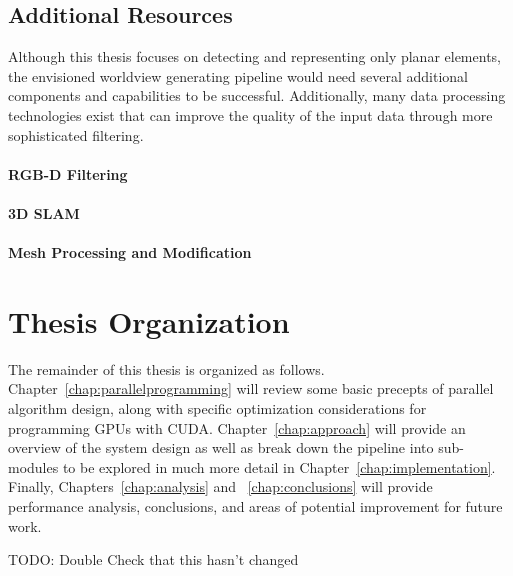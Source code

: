 \subsection{Additional Resources}
Although this thesis focuses on detecting and representing only planar elements, the envisioned worldview generating pipeline would need several additional components and capabilities to be successful. Additionally, many data processing technologies exist that can improve the quality of the input data through more sophisticated filtering.
\paragraph{RGB-D Filtering}
\paragraph{3D SLAM}
\paragraph{Mesh Processing and Modification}
\section{Thesis Organization} %
The remainder of this thesis is organized as follows. Chapter~\ref{chap:parallelprogramming} will review some basic precepts of parallel algorithm design, along with specific optimization considerations for programming GPUs with CUDA. Chapter~\ref{chap:approach} will provide an overview of the system design as well as break down the pipeline into sub-modules to be explored in much more detail in Chapter~\ref{chap:implementation}. Finally, Chapters~\ref{chap:analysis} and ~\ref{chap:conclusions} will provide performance analysis, conclusions, and areas of potential improvement for future work.\par
{\color{red} TODO: Double Check that this hasn't changed}